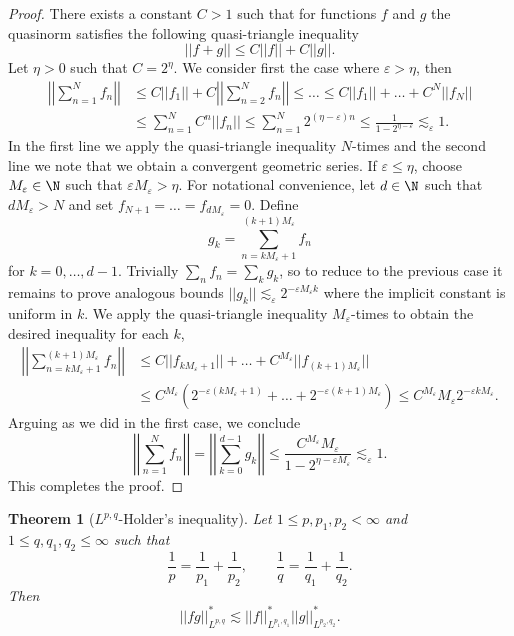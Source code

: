 \documentclass[reqno]{amsart}
\newtheorem{theorem}{Theorem}
\theoremstyle{definition}
\theoremstyle{remark}
\renewcommand{\epsilon}{\varepsilon}
\begin{document}
\begin{proof}
	There exists a constant $C > 1$ such that for functions $f$ and $g$ the quasinorm satisfies the following quasi-triangle inequality
		\[ ||f + g|| \leq C ||f|| + C ||g||. \]
	Let $\eta > 0$ such that $C = 2^\eta$. We consider first the case where $\epsilon > \eta$, then
		\begin{align*}
			 \left| \left| \sum_{n = 1}^N f_n \right| \right|
			 	&\leq C ||f_1|| + C  \left| \left| \sum_{n = 2}^N f_n \right| \right| \leq \dots \leq C||f_1|| + \dots + C^N ||f_N|| \\
			 	&\leq \sum_{n = 1}^N C^n ||f_n|| \leq \sum_{n = 1}^N 2^{(\eta - \epsilon) n} \leq \frac{1}{1 - 2^{\eta - \epsilon}} \lesssim_\epsilon 1.
		\end{align*} 
	In the first line we apply the quasi-triangle inequality	$N$-times and the second line we note that we obtain a convergent geometric series. If $\epsilon \leq \eta$, choose $M_\epsilon \in \N$ such that $\epsilon M_\epsilon > \eta$. For notational convenience, let $d \in \N$ such that $dM_\epsilon > N$ and set $f_{N + 1} = \dots = f_{dM_\epsilon} = 0$. Define 
		\[ g_k = \sum_{n = kM_\epsilon + 1}^{(k + 1)M_\epsilon} f_n \]
	for $k = 0, \dots, d - 1$. Trivially $\sum_n f_n = \sum_k g_k$, so to reduce to the previous case it remains to prove analogous bounds $||g_k|| \lesssim_\epsilon 2^{-\epsilon M_\epsilon k}$ where the implicit constant is uniform in $k$. We apply the quasi-triangle inequality $M_\epsilon$-times to obtain the desired inequality for each $k$, 
		\begin{align*}
			\left|\left| \sum_{n = kM_\epsilon + 1}^{(k + 1)M_\epsilon} f_n \right|\right|
				&\leq C ||f_{kM_\epsilon + 1}|| + \dots + C^{M_\epsilon} ||f_{(k + 1)M_\epsilon}||\\
				&\leq C^{M_\epsilon} \left( 2^{-\epsilon (kM_\epsilon + 1)} + \dots + 2^{-\epsilon (k + 1)M_\epsilon} \right) \leq C^{M_\epsilon} M_\epsilon 2^{-\epsilon kM_\epsilon}.
		\end{align*}	
	Arguing as we did in the first case, we conclude
		\[ \left| \left| \sum_{n = 1}^N f_n \right| \right| = \left| \left| \sum_{k = 0}^{d - 1} g_k \right|\right| \leq \frac{C^{M_\epsilon} M_\epsilon}{1 - 2^{\eta - \epsilon M_\epsilon}}\lesssim_\epsilon 1. \]
	This completes the proof.  
\end{proof}

\begin{theorem}[$L^{p, q}$-Holder's inequality]
	Let $1 \leq p, p_1, p_2 < \infty$ and $1 \leq q, q_1, q_2 \leq \infty$ such that 
		\[ \frac1p = \frac{1}{p_1} + \frac{1}{p_2},\qquad \frac1q = \frac{1}{q_1} + \frac{1}{q_2}.\]
	Then
		\[ ||f g||_{L^{p, q}}^* \lesssim ||f||_{L^{p_1, q_1}}^* ||g||_{L^{p_2, q_2}}^*.  \]
\end{theorem}
\end{document}
